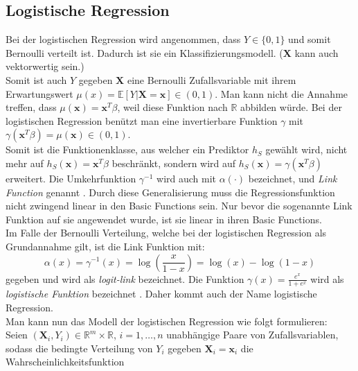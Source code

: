 \subsection{Logistische Regression}
Bei der logistischen Regression wird angenommen, dass $Y \in \{0,1\}$ und somit Bernoulli verteilt ist.
Dadurch ist sie ein Klassifizierungsmodell. ($\mathbf{X}$ kann auch vektorwertig sein.)  \\

Somit ist auch $Y$ gegeben $\mathbf{X}$ eine Bernoulli Zufallsvariable mit ihrem Erwartungswert $\mu(x) = \mathbb{E}[Y|\mathbf{X} = \mathbf{x}] \in (0,1)$. Man kann nicht die Annahme treffen, dass
$\mu(\mathbf{x}) = \mathbf{x}^T\beta$, weil diese Funktion nach $\mathbb{R}$ abbilden w\"urde. Bei der logistischen Regression ben\"utzt man eine invertierbare Funktion $\gamma$ mit
$\gamma(\mathbf{x}^T\beta) = \mu(\mathbf{x}) \in (0,1)$. \\

Somit ist die Funktionenklasse, aus welcher ein Prediktor $h_S$ gew\"ahlt wird, nicht mehr auf $h_S(\mathbf{x}) = \mathbf{x}^T\beta$ beschr\"ankt,
sondern wird auf  $h_S(\mathbf{x}) = \gamma(\mathbf{x}^T\beta)$ erweitert. Die Umkehrfunktion $\gamma^{-1}$ wird auch mit $\alpha(\cdot)$ bezeichnet,
und \textit{Link Function} genannt \cite[Seite 180]{bishop}. Durch diese Generalisierung muss die Regressionsfunktion nicht zwingend linear in den Basic Functions sein.
Nur bevor die sogenannte Link Funktion auf sie angewendet wurde, ist sie linear in ihren Basic Functions. \\

Im Falle der Bernoulli Verteilung, welche bei der logistischen Regression als Grundannahme gilt, ist die Link Funktion mit:
$$ \alpha(x) = \gamma^{-1}(x) = \log(\frac{x}{1-x}) = \log(x) - \log(1-x) $$
gegeben und wird als \textit{logit-link} bezeichnet. Die Funktion $\gamma(x) = \frac{e^x}{1 + e^x}$ wird als \textit{logistische Funktion} bezeichnet \cite[Seite 223]{wasserman}.
Daher kommt auch der Name \glqq logistische Regression\grqq{}. \\


Man kann nun das Modell der logistischen Regression wie folgt formulieren: \\
Seien $(\mathbf{X}_i, Y_i) \in \mathbb{R}^m \times \mathbb{R}$, $i = 1, \dots , n$  unabh\"angige Paare von Zufallsvariablen, sodass die bedingte Verteilung von
$Y_i$ gegeben $\mathbf{X}_i = \mathbf{x}_i$ die Wahrscheinlichkeitsfunktion

